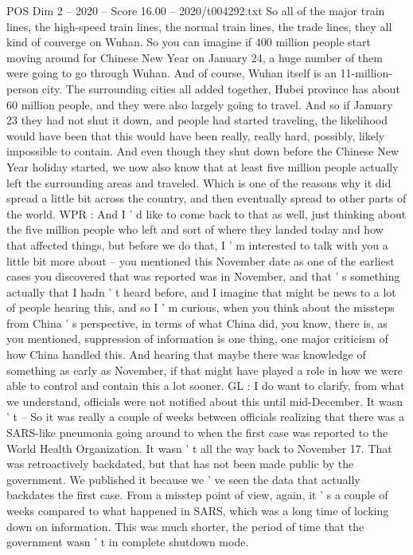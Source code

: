 \begin{textsample}{POS Dim 2 – 2020 – Score 16.00 – 2020/t004292.txt}
So all of the major train lines, the high-speed train lines, the normal train lines, the trade lines, they all kind of converge on Wuhan.
So you can imagine if 400 million people start moving around for Chinese New Year on January 24, a huge number of them were going to go through Wuhan.
And of course, Wuhan itself is an 11-million-person city.
The surrounding cities all added together, Hubei province has about 60 million people, and they were also largely going to travel.
And so if January 23 they had not shut it down, and people had started traveling, the likelihood would have been that this would have been really, really hard, possibly, likely impossible to contain.
And even though they shut down before the Chinese New Year holiday started, we now also know that at least five million people actually left the surrounding areas and traveled.
Which is one of the reasons why it did spread a little bit across the country, and then eventually spread to other parts of the world.
WPR : And I ' d like to come back to that as well, just thinking about the five million people who left and sort of where they landed today and how that affected things, but before we do that, I ' m interested to talk with you a little bit more about -- you mentioned this November date as one of the earliest cases you discovered that was reported was in November, and that ' s something actually that I hadn ' t heard before, and I imagine that might be news to a lot of people hearing this, and so I ' m curious, when you think about the missteps from China ' s perspective, in terms of what China did, you know, there is, as you mentioned, suppression of information is one thing, one major criticism of how China handled this.
And hearing that maybe there was knowledge of something as early as November, if that might have played a role in how we were able to control and contain this a lot sooner.
GL : I do want to clarify, from what we understand, officials were not notified about this until mid-December.
It wasn ' t -- So it was really a couple of weeks between officials realizing that there was a SARS-like pneumonia going around to when the first case was reported to the World Health Organization.
It wasn ' t all the way back to November 17.
That was retroactively backdated, but that has not been made public by the government.
We published it because we ' ve seen the data that actually backdates the first case.
From a misstep point of view, again, it ' s a couple of weeks compared to what happened in SARS, which was a long time of locking down on information.
This was much shorter, the period of time that the government wasn ' t in complete shutdown mode.

\end{textsample}
